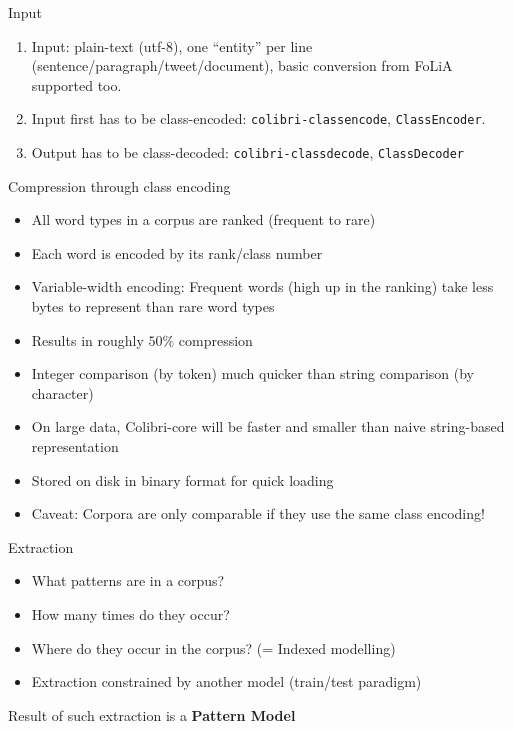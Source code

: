\documentclass[compress]{beamer}
\begin{document}
\begin{frame}
  \begin{block}{Input}
    \begin{enumerate}
      \item Input: plain-text (utf-8), one ``entity'' per line
       (sentence/paragraph/tweet/document), basic conversion from FoLiA supported too.
     \item Input first has to be class-encoded: \texttt{colibri-classencode},
       \texttt{ClassEncoder}.
      \item Output has to be class-decoded: \texttt{colibri-classdecode},
        \texttt{ClassDecoder}
    \end{enumerate}
  \end{block}
\end{frame}

\begin{frame}

  \begin{block}{Compression through class encoding}
    \begin{itemize}
      \item All word types in a corpus are ranked (frequent to rare)
      \item Each word is encoded by its rank/class number
      \item Variable-width encoding: Frequent words (high up in the ranking)
        take less bytes to represent than rare word types
      \item Results in roughly $50\%$ compression
      \item Integer comparison (by token) much quicker than string comparison
        (by character)
      \item On large data, Colibri-core will be faster and smaller than naive string-based representation
      \item Stored on disk in binary format for quick loading
      \item Caveat: Corpora are only comparable if they use the same class
        encoding!
    \end{itemize}
  \end{block}

\end{frame}

\begin{frame}
  \begin{block}{Extraction}
    \begin{itemize}
      \item What patterns are in a corpus? 
      \item How many times do they occur?
      \item Where do they occur in the corpus? (= Indexed modelling)
      \item Extraction constrained by another model (train/test paradigm)
    \end{itemize}
    Result of such extraction is a \textbf{Pattern Model}
  \end{block}
\end{frame}
\end{document}
